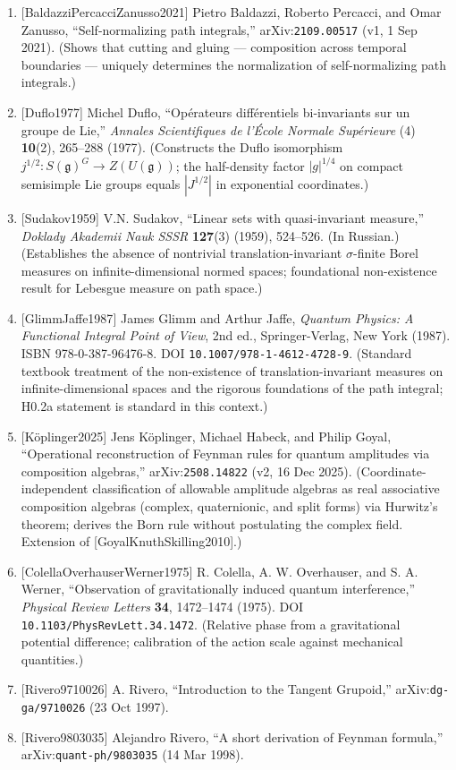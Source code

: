 \documentclass[
]{article}
\begin{document}
\begin{enumerate}
  semigroup/composition property of the path integral; direct precedent
  for P4.2's composition-forced normalization.)
\item
  {[}BaldazziPercacciZanusso2021{]} Pietro Baldazzi, Roberto Percacci,
  and Omar Zanusso, ``Self-normalizing path integrals,''
  arXiv:\texttt{2109.00517} (v1, 1 Sep 2021). (Shows that cutting and
  gluing --- composition across temporal boundaries --- uniquely
  determines the normalization of self-normalizing path integrals.)
\item
  {[}Duflo1977{]} Michel Duflo, ``Opérateurs différentiels bi-invariants
  sur un groupe de Lie,'' \emph{Annales Scientifiques de l'École Normale
  Supérieure} (4) \textbf{10}(2), 265--288 (1977). (Constructs the Duflo
  isomorphism \(j^{1/2}\colon S(\mathfrak{g})^G\to Z(U(\mathfrak{g}))\);
  the half-density factor \(|g|^{1/4}\) on compact semisimple Lie groups
  equals \(|J^{1/2}|\) in exponential coordinates.)
\item
  {[}Sudakov1959{]} V.N. Sudakov, ``Linear sets with quasi-invariant
  measure,'' \emph{Doklady Akademii Nauk SSSR} \textbf{127}(3) (1959),
  524--526. (In Russian.) (Establishes the absence of nontrivial
  translation-invariant \(\sigma\)-finite Borel measures on
  infinite-dimensional normed spaces; foundational non-existence result
  for Lebesgue measure on path space.)
\item
  {[}GlimmJaffe1987{]} James Glimm and Arthur Jaffe, \emph{Quantum
  Physics: A Functional Integral Point of View}, 2nd ed.,
  Springer-Verlag, New York (1987). ISBN 978-0-387-96476-8. DOI
  \texttt{10.1007/978-1-4612-4728-9}. (Standard textbook treatment of
  the non-existence of translation-invariant measures on
  infinite-dimensional spaces and the rigorous foundations of the path
  integral; H0.2a statement is standard in this context.)
\item
  {[}Köplinger2025{]} Jens Köplinger, Michael Habeck, and Philip Goyal,
  ``Operational reconstruction of Feynman rules for quantum amplitudes
  via composition algebras,'' arXiv:\texttt{2508.14822} (v2, 16 Dec
  2025). (Coordinate-independent classification of allowable amplitude
  algebras as real associative composition algebras (complex,
  quaternionic, and split forms) via Hurwitz's theorem; derives the Born
  rule without postulating the complex field. Extension of
  {[}GoyalKnuthSkilling2010{]}.)
\item
  {[}ColellaOverhauserWerner1975{]} R. Colella, A. W. Overhauser, and S.
  A. Werner, ``Observation of gravitationally induced quantum
  interference,'' \emph{Physical Review Letters} \textbf{34}, 1472--1474
  (1975). DOI \texttt{10.1103/PhysRevLett.34.1472}. (Relative phase from
  a gravitational potential difference; calibration of the action scale
  against mechanical quantities.)
\item
  {[}Rivero9710026{]} A. Rivero, ``Introduction to the Tangent
  Grupoid,'' arXiv:\texttt{dg-ga/9710026} (23 Oct 1997).
\item
  {[}Rivero9803035{]} Alejandro Rivero, ``A short derivation of Feynman
  formula,'' arXiv:\texttt{quant-ph/9803035} (14 Mar 1998).
\end{enumerate}
\end{document}
